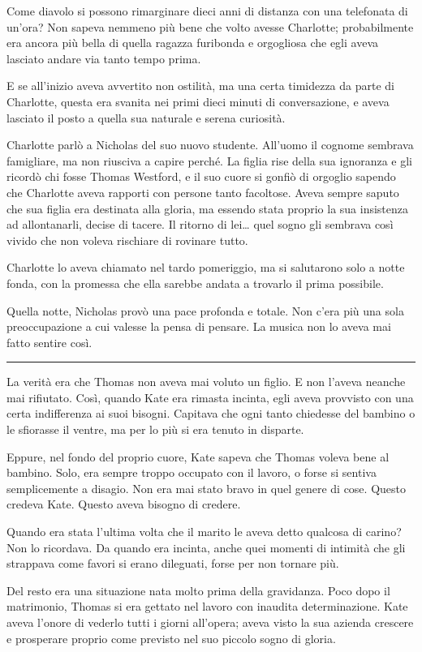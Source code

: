 \documentclass[a4paper,oneside,11pt]{memoir}
\begin{document}
Come diavolo si possono rimarginare dieci anni di distanza con una telefonata di
un'ora? Non sapeva nemmeno più bene che volto avesse Charlotte; probabilmente
era ancora più bella di quella ragazza furibonda e orgogliosa che egli aveva
lasciato andare via tanto tempo prima.

E se all'inizio aveva avvertito non ostilità, ma una certa timidezza da parte di
Charlotte, questa era svanita nei primi dieci minuti di conversazione, e aveva
lasciato il posto a quella sua naturale e serena curiosità.

Charlotte parlò a Nicholas del suo nuovo studente. All'uomo il cognome sembrava
famigliare, ma non riusciva a capire perché. La figlia rise della sua ignoranza
e gli ricordò chi fosse Thomas Westford, e il suo cuore si gonfiò di orgoglio
sapendo che Charlotte aveva rapporti con persone tanto facoltose. Aveva sempre
saputo che sua figlia era destinata alla gloria, ma essendo stata proprio la sua
insistenza ad allontanarli, decise di tacere. Il ritorno di lei\dots{} quel
sogno gli sembrava così vivido che non voleva rischiare di rovinare tutto.

Charlotte lo aveva chiamato nel tardo pomeriggio, ma si salutarono solo a notte
fonda, con la promessa che ella sarebbe andata a trovarlo il prima possibile.

Quella notte, Nicholas provò una pace profonda e totale. Non c'era più una sola
preoccupazione a cui valesse la pensa di pensare. La musica non lo aveva mai
fatto sentire così.

\plainbreak{1}

La verità era che Thomas non aveva mai voluto un figlio. E non l'aveva neanche
mai rifiutato. Così, quando Kate era rimasta incinta, egli aveva provvisto con
una certa indifferenza ai suoi bisogni. Capitava che ogni tanto chiedesse del
bambino o le sfiorasse il ventre, ma per lo più si era tenuto in disparte.

Eppure, nel fondo del proprio cuore, Kate sapeva che Thomas voleva bene al
bambino. Solo, era sempre troppo occupato con il lavoro, o forse si sentiva
semplicemente a disagio. Non era mai stato bravo in quel genere di cose. Questo
credeva Kate. Questo aveva bisogno di credere.

Quando era stata l'ultima volta che il marito le aveva detto qualcosa di carino?
Non lo ricordava. Da quando era incinta, anche quei momenti di intimità che gli
strappava come favori si erano dileguati, forse per non tornare più.

Del resto era una situazione nata molto prima della gravidanza. Poco dopo il
matrimonio, Thomas si era gettato nel lavoro con inaudita determinazione. Kate
aveva l'onore di vederlo tutti i giorni all'opera; aveva visto la sua azienda
crescere e prosperare proprio come previsto nel suo piccolo sogno di gloria.
\end{document}
